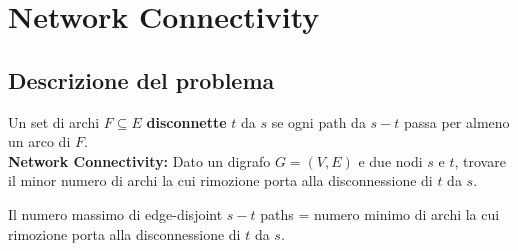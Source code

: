 \section{Network Connectivity}

\subsection{Descrizione del problema}

Un set di archi $F \subseteq E$ \textbf{disconnette} $t$ da $s$ se
ogni path da $s-t$ passa per almeno un arco di $F$.\\

\textbf{Network Connectivity:} Dato un digrafo $G = (V,E)$ e due nodi
$s$ e $t$, trovare il minor numero di archi la cui rimozione porta
alla disconnessione di $t$ da $s$.

\begin{myblockquote}
	\begin{minipage}{\textwidth}
		\begin{theorem}
			Il numero massimo di edge-disjoint $s-t$ paths = numero minimo di
			archi la cui rimozione porta alla disconnessione di $t$ da $s$.
		\end{theorem}
	\end{minipage}
\end{myblockquote}

